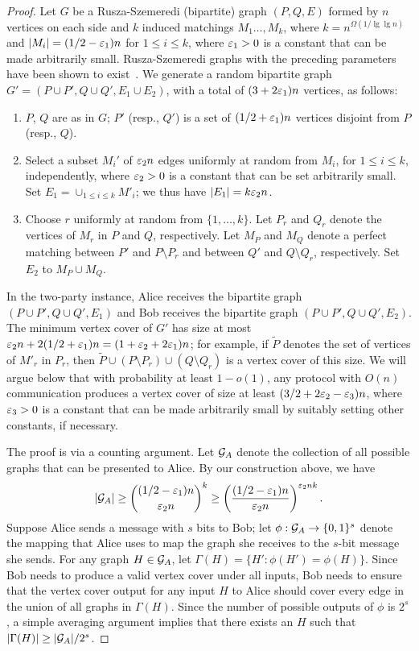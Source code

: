 \documentclass[11pt]{article}
\begin{document}
\begin{proof}
    
\label{app:lower bound}
Let $G$ be a Rusza-Szemeredi (bipartite) graph $(P, Q, E)$ formed by
$n$ vertices on each side and $k$ induced matchings $M_1 \ldots, M_k$,
where $k = n^{\Omega(1/\lg\lg n)}$ and $|M_i| = (1/2 - \varepsilon_1)n$ for $1 \le i
\le k$, where $\varepsilon_1 > 0$ is a constant that can be made arbitrarily
small.  Rusza-Szemeredi graphs with the preceding parameters have been
shown to exist~\cite{DBLP:conf/soda/GoelKK12}.  We generate a random
bipartite graph $G' = (P \cup P', Q \cup Q', E_1 \cup E_2)$, with a total of 
$(3+2\varepsilon_1)n$ vertices, as follows:
\begin{enumerate}
\item
  $P$, $Q$ are as in $G$; $P'$ (resp., $Q'$) is a set of $(1/2 +
  \varepsilon_1)n$ vertices disjoint from $P$ (resp., $Q$).
\item
  Select a subset $M_i'$ of $\varepsilon_2 n$ edges uniformly at random from
  $M_i$, for $1 \le i \le k$, independently, where $\varepsilon_2 > 0$ is a
  constant that can be set arbitrarily small.  Set $E_1 = \cup_{1 \le
    i \le k} M'_i$; we thus have $|E_1| = k \varepsilon_2 n$.
\item
  Choose $r$ uniformly at random from $\{1, \ldots, k\}$.  Let $P_r$
  and $Q_r$ denote the vertices of $M_r$ in $P$ and $Q$, respectively.
  Let $M_P$ and $M_Q$ denote a perfect matching between $P'$ and $P
  \setminus P_r$ and between $Q'$ and $Q \setminus Q_r$,
  respectively.  Set $E_2$ to $M_P \cup M_Q$.
\end{enumerate}
In the two-party instance, Alice receives the bipartite graph $(P
\cup P', Q \cup Q', E_1)$ and Bob receives the bipartite graph
$(P \cup P', Q \cup Q', E_2)$.  The minimum vertex cover of $G'$
has size at most $\varepsilon_2 n + 2(1/2 + \varepsilon_1)n = (1 + \varepsilon_2 +
2\varepsilon_1)n$; for example, if $\widetilde{P}$ denotes the set of vertices of $M'_r$
in $P_r$, then $\widetilde{P} \cup (P \setminus P_r) \cup (Q \setminus Q_r)$ is a
vertex cover of this size.  We will argue below that with probability
at least $1 - o(1)$, any protocol with $O(n)$ communication produces a
vertex cover of size at least $(3/2 + 2\varepsilon_2 - \varepsilon_3)n$, where
$\varepsilon_3 > 0$ is a constant that can be made arbitrarily small by
suitably setting other constants, if necessary.

The proof is via a counting argument.  Let ${\cal G}_A$ denote the
collection of all possible graphs that can be presented to Alice.  By
our construction above, we have
\[
|{\cal G}_A| \ge \binom{(1/2 - \varepsilon_1)n}{\varepsilon_2 n}^k \ge \left(\frac{(1/2 - \varepsilon_1)n}{\varepsilon_2 n}\right)^{\varepsilon_2 n k}. 
\]
Suppose Alice sends a message with $s$ bits to Bob; let $\phi: {\cal
  G}_A \rightarrow \{0,1\}^s$ denote the mapping that Alice uses to
map the graph she receives to the $s$-bit message she sends.  For any
graph $H \in {\cal G}_A$, let $\Gamma(H) = \{H': \phi(H') =
\phi(H)\}$.  Since Bob needs to produce a valid vertex cover under all
inputs, Bob needs to ensure that the vertex cover output for any input
$H$ to Alice should cover every edge in the union of all graphs in
$\Gamma(H)$.  Since the number of possible outputs of $\phi$ is $2^s$,
a simple averaging argument implies that there exists an $H$ such that
$|\Gamma(H)| \ge |{\cal G}_A|/2^s$.


\end{proof}
\end{document}
